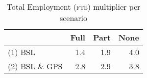 \begin{table}[H]
\centering
\caption{\label{multchwex}Total Employment (\textsc{fte})  multiplier per scenario} 
\begin{tabular}{lrrr}
  \hline
 & Full & Part & None \\ 
  \hline
(1) BSL & 1.4 & 1.9 & 4.0 \\ 
  (2) BSL \& GPS & 2.8 & 2.9 & 3.8 \\ 
   \hline
\end{tabular}
\end{table}
